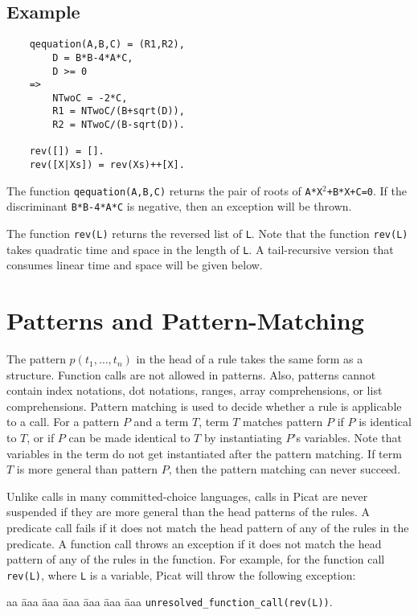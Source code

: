 \subsection*{Example}
\begin{verbatim}
    qequation(A,B,C) = (R1,R2), 
        D = B*B-4*A*C, 
        D >= 0 
    => 
        NTwoC = -2*C,
        R1 = NTwoC/(B+sqrt(D)),
        R2 = NTwoC/(B-sqrt(D)).

    rev([]) = [].
    rev([X|Xs]) = rev(Xs)++[X].
\end{verbatim}
The function \texttt{qequation(A,B,C)} returns the pair of roots of \texttt{A*X$^2$+B*X+C=0}. If the discriminant \texttt{B*B-4*A*C} is negative, then an exception will be thrown. 

The function \texttt{rev(L)} returns the reversed list of \texttt{L}. Note that the function \texttt{rev(L)} takes quadratic time and space in the length of \texttt{L}. A tail-recursive version that consumes linear time and space will be given below.

\section{Patterns and Pattern-Matching}
The pattern $p(t_1,\ldots,t_n)$ in the head of a rule takes the same form as a structure. Function calls are not allowed in patterns. Also, patterns cannot contain index notations, dot notations, ranges, array comprehensions, or list comprehensions. Pattern matching is used to decide whether a rule is applicable to a call. For a pattern $P$ and a term $T$, term $T$ matches pattern $P$ if $P$ is identical to $T$, or if $P$ can be made identical to $T$ by instantiating $P$'s variables. Note that variables in the term do not get instantiated after the pattern matching. If term $T$ is more general than pattern $P$, then the pattern matching can never succeed.

Unlike calls in many committed-choice languages, calls in Picat are never suspended if they are more general than the head patterns of the rules. A predicate call fails if it does not match the head pattern of any of the rules in the predicate. A function call throws an exception if it does not match the head pattern of any of the rules in the function. For example, for the function call \texttt{rev(L)}, where \texttt{L} is a variable, Picat will throw the following exception:

\begin{tabbing}
aa \= aaa \= aaa \= aaa \= aaa \= aaa \= aaa \kill
\> \> \texttt{unresolved\_function\_call(rev(L))}.
\end{tabbing}


